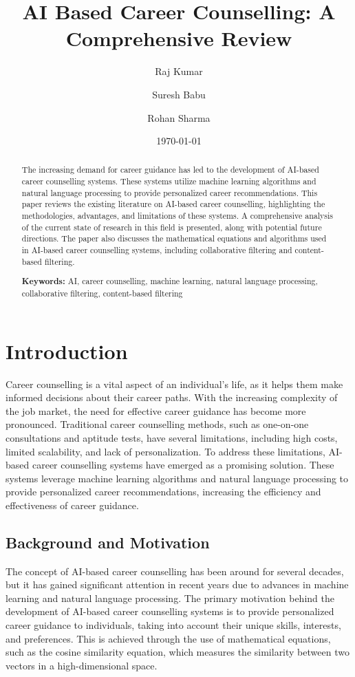 \documentclass[12pt,a4paper]{article}
\title{AI Based Career Counselling: A Comprehensive Review}
\author{Raj Kumar \and Suresh Babu \and Rohan Sharma}
\date{\today}
\begin{document}
\maketitle
\thispagestyle{empty}

\begin{abstract}
The increasing demand for career guidance has led to the development of AI-based career counselling systems. These systems utilize machine learning algorithms and natural language processing to provide personalized career recommendations. This paper reviews the existing literature on AI-based career counselling, highlighting the methodologies, advantages, and limitations of these systems. A comprehensive analysis of the current state of research in this field is presented, along with potential future directions. The paper also discusses the mathematical equations and algorithms used in AI-based career counselling systems, including collaborative filtering and content-based filtering.

\textbf{Keywords:} AI, career counselling, machine learning, natural language processing, collaborative filtering, content-based filtering
\end{abstract}

\newpage
\tableofcontents
\newpage

\twocolumn
\section{Introduction}
Career counselling is a vital aspect of an individual's life, as it helps them make informed decisions about their career paths. With the increasing complexity of the job market, the need for effective career guidance has become more pronounced. Traditional career counselling methods, such as one-on-one consultations and aptitude tests, have several limitations, including high costs, limited scalability, and lack of personalization. To address these limitations, AI-based career counselling systems have emerged as a promising solution. These systems leverage machine learning algorithms and natural language processing to provide personalized career recommendations, increasing the efficiency and effectiveness of career guidance.

\subsection{Background and Motivation}
The concept of AI-based career counselling has been around for several decades, but it has gained significant attention in recent years due to advances in machine learning and natural language processing. The primary motivation behind the development of AI-based career counselling systems is to provide personalized career guidance to individuals, taking into account their unique skills, interests, and preferences. This is achieved through the use of mathematical equations, such as the cosine similarity equation, which measures the similarity between two vectors in a high-dimensional space.
\end{document}
